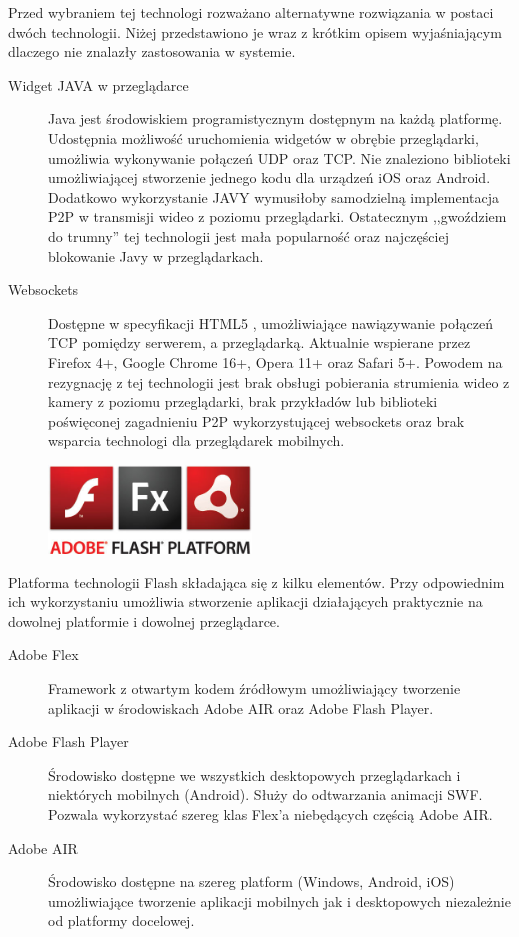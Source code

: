 Przed wybraniem tej technologi rozważano alternatywne rozwiązania w postaci dwóch technologii. Niżej przedstawiono je wraz z krótkim opisem wyjaśniającym dlaczego nie znalazły zastosowania w systemie.
\begin{description}
    \item[Widget JAVA w przeglądarce] Java jest środowiskiem programistycznym dostępnym na każdą platformę. Udostępnia możliwość uruchomienia widgetów w obrębie przeglądarki, umożliwia wykonywanie połączeń UDP oraz TCP. Nie znaleziono biblioteki umożliwiającej stworzenie jednego kodu dla urządzeń iOS oraz Android. Dodatkowo wykorzystanie JAVY wymusiłoby samodzielną implementacja P2P w transmisji wideo z poziomu przeglądarki. Ostatecznym ,,gwoździem do trumny'' tej technologii jest mała popularność oraz najczęściej blokowanie Javy w przeglądarkach.
    \item[Websockets] Dostępne w specyfikacji HTML5 \cite{rfc6455}, umożliwiające nawiązywanie połączeń TCP pomiędzy serwerem, a przeglądarką. Aktualnie wspierane przez  Firefox 4+, Google Chrome 16+, Opera 11+ oraz Safari 5+. Powodem na rezygnację z tej technologii jest brak obsługi pobierania strumienia wideo z kamery z poziomu przeglądarki, brak przykładów lub biblioteki poświęconej zagadnieniu P2P wykorzystującej websockets oraz brak wsparcia technologi dla przeglądarek mobilnych.
\end{description}

\begin{figure}
  \begin{center}
    \includegraphics[width=0.48\textwidth]{img/logos/adobe-flash-platform.jpg}
  \end{center}
\end{figure}

Platforma technologii Flash składająca się z kilku elementów. Przy odpowiednim ich wykorzystaniu umożliwia stworzenie aplikacji działających praktycznie na dowolnej platformie i dowolnej przeglądarce.

\begin{description}
    \item[Adobe Flex] Framework z otwartym kodem źródłowym umożliwiający tworzenie aplikacji w środowiskach Adobe AIR oraz Adobe Flash Player.
    \item[Adobe Flash Player] Środowisko dostępne we wszystkich desktopowych przeglądarkach i niektórych mobilnych (Android). Służy do odtwarzania animacji SWF. Pozwala wykorzystać szereg klas Flex'a niebędących częścią Adobe AIR.
    \item[Adobe AIR] Środowisko dostępne na szereg platform (Windows, Android, iOS) umożliwiające tworzenie aplikacji mobilnych jak i desktopowych niezależnie od platformy docelowej.
\end{description}

